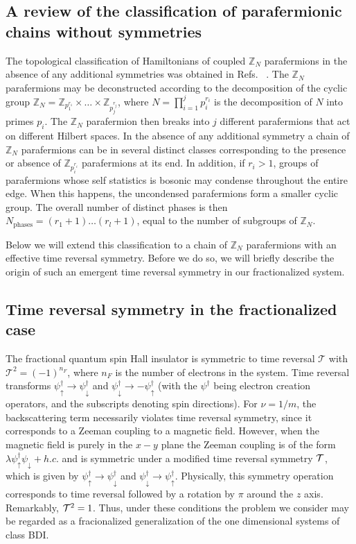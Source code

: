 \documentclass[twocolumn,aps,prb,showpacs]{revtex4-1}
\begin{document}
\subsection{A  review of the classification of  parafermionic chains without symmetries}
The topological classification of Hamiltonians of coupled $\mathbb{Z}_N$ parafermions in the absence of any additional symmetries was obtained in Refs.~ . The $\mathbb{Z}_N$ parafermions may be deconstructed according to the decomposition of the cyclic group $\mathbb{Z}_N=\mathbb{Z}_{p_1^{r_1}}\times \dots \times \mathbb{Z}_{p_j^{r_j}}$, where $N=\prod_{i=1}^j p_i^{r_i}$ is the decomposition of $N$ into primes $p_i$.
The $\mathbb{Z}_N$ parafermion then breaks into $j$ different parafermions that act on different Hilbert spaces.
 In the absence of any additional symmetry a chain of $\mathbb{Z}_N$ parafermions can be in several distinct classes corresponding to the presence or absence of $\mathbb{Z}_{p_i^{r_i}} $ parafermions at its end. In addition, if
 $r_i>1$,
groups of parafermions whose self statistics is bosonic may condense throughout the entire edge. When this happens, the uncondensed parafermions  form a smaller cyclic group. The overall number of distinct phases is then $N_{\mathrm{phases}} =  (r_1+1) \dots (r_l+1)$, equal to the number of subgroups of $\mathbb{Z}_N$.

Below we will extend this classification to a chain of $\mathbb{Z}_N $ parafermions with an effective time reversal symmetry.  Before we do so, we will briefly describe the origin of such an emergent time reversal symmetry in our fractionalized system.

\subsection{Time reversal symmetry in the fractionalized case}
The fractional quantum spin Hall insulator is symmetric to time reversal $\mathcal{T}$ with$\mathcal{T}^2=(-1)^{n_F}$, where $n_F$ is the number of electrons in the system. Time reversal transforms $\psi^\dagger_\uparrow \rightarrow\psi^\dagger_\downarrow$ and $\psi^\dagger_\downarrow \rightarrow -\psi^\dagger_\uparrow$ (with the $\psi^\dagger$ being electron creation operators, and the subscripts denoting spin directions). For $\nu=1/m$, the backscattering term necessarily violates time reversal symmetry, since it corresponds to a Zeeman coupling to a magnetic field. However, when the magnetic field is purely in the $x-y$ plane the Zeeman coupling is of the form $\lambda\psi^\dagger_\uparrow\psi_\downarrow +h.c.$ and is symmetric under a modified time reversal symmetry ${\cal T}$, which is given by $\psi^\dagger_\uparrow \rightarrow\psi^\dagger_\downarrow$ and $\psi^\dagger_\downarrow \rightarrow \psi^\dagger_\uparrow$.  Physically, this symmetry operation corresponds to time reversal followed by a rotation by $\pi$ around the $z$ axis. Remarkably, ${\cal T}^2=1$. Thus, under these conditions the problem we consider may be regarded as a fracionalized generalization of the one dimensional systems of class BDI.
\end{document}
